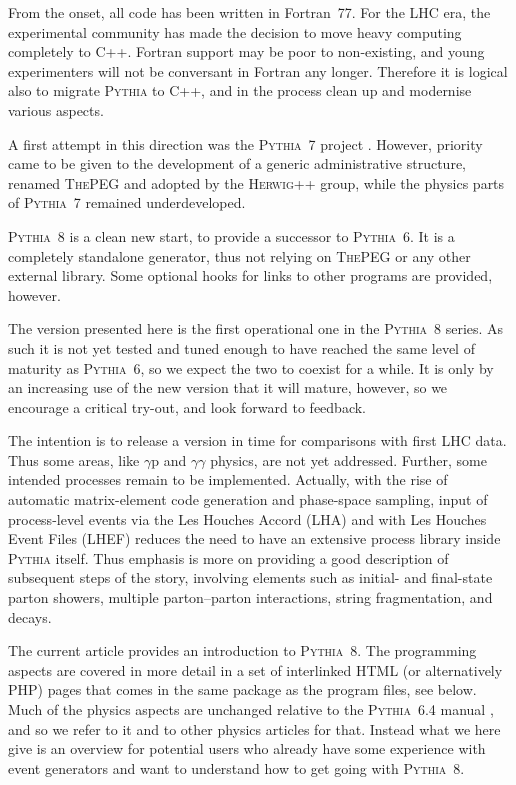 \documentclass{elsartmod}
\begin{document}
{}From the onset, all code has been written in Fortran~77. For the
LHC era, the experimental community has made the decision to 
move heavy computing completely to C++. Fortran support 
may be poor to non-existing, and young experimenters will not
be conversant in Fortran any longer. Therefore it is logical
also to migrate \textsc{Pythia} to C++, and in the process clean
up and modernise various aspects. 

A first attempt in this direction was the \textsc{Pythia}~7 project
\cite{pythiaseven}. However, priority came to be given to the
development of a generic administrative structure, renamed
\textsc{ThePEG} \cite{thepeg} and adopted by the \textsc{Herwig++} 
\cite{herwigpp} group, while the physics parts of \textsc{Pythia}~7
remained underdeveloped.

\textsc{Pythia}~8 is a clean new start, to provide a successor to
\textsc{Pythia}~6. It is a completely standalone generator, thus not 
relying on \textsc{ThePEG} or any other external library. Some 
optional hooks for links to other programs are provided, however. 

The version presented here is the first operational one in the 
\textsc{Pythia}~8 series. As such it is not yet tested and tuned 
enough to have reached the same level of maturity as \textsc{Pythia}~6,
so we expect the two to coexist for a while. It is only by an
increasing use of the new version that it will mature, however, 
so we encourage a critical try-out, and look forward to feedback. 

The intention is to release a version in time for comparisons
with first LHC data. Thus some areas, like $\gamma\mathrm{p}$ and
$\gamma\gamma$ physics, are not yet addressed. Further, some  
intended processes remain to be implemented. Actually, with the 
rise of automatic matrix-element code generation and phase-space 
sampling, input of process-level events via the Les Houches Accord 
(LHA) \cite{lha} and with Les Houches Event Files (LHEF) \cite{lhef} 
reduces the need to have an extensive process library inside 
\textsc{Pythia} itself. Thus emphasis is more on providing a good 
description of subsequent steps of the story, involving elements 
such as initial- and final-state parton showers, multiple 
parton--parton interactions, string fragmentation, and decays. 

The current article provides an introduction to \textsc{Pythia}~8. 
The programming aspects are covered in more detail in a set 
of interlinked HTML (or alternatively PHP) pages that comes in the
same package as the program files, see below. 
Much of the physics aspects are unchanged 
relative to the \textsc{Pythia}~6.4 manual \cite{pythiasixfour}, and 
so we refer to it and to other physics articles for that. Instead 
what we here give is an overview for potential users who already 
have some experience with event generators and want to understand 
how to get going with \textsc{Pythia}~8.     
\end{document}
